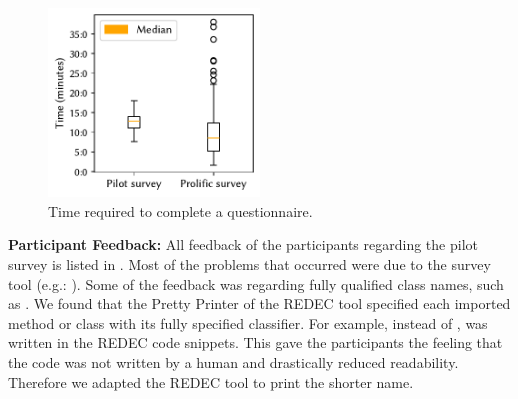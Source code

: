 \documentclass[%
class=scrreprt,
chapterprefix=false,%
open=right,%
twoside=false,%
paper=a4,%
logofile={Logo\_zentral\_farbig\_EN.png},%
thesistype=master,%
UKenglish,%
]{se2thesis}
\theoremstyle{definition}
\newcommand{\rdh}{REDEC\xspace}
\begin{document}
	\begin{figure}[tb]
		\centering
		\includegraphics[width=0.5\textwidth]{img/survey_times.pdf}
		\caption{Time required to complete a questionnaire.}
		\label{fig:survey_times}
	\end{figure}
		
	\textbf{Participant Feedback:}
	All feedback of the participants regarding the pilot survey is listed in .
	Most of the problems that occurred were due to the survey tool (e.g.: ).
	Some of the feedback was regarding fully qualified class names, such as . We found that the Pretty Printer of the \rdh tool specified each imported method or class with its fully specified classifier. For example, instead of ,  was written in the \rdh code snippets. This gave the participants the feeling that the code was not written by a human and drastically reduced readability. Therefore we adapted the \rdh tool to print the shorter name.
	
\end{document}
